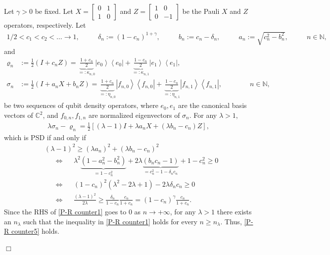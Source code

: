 \documentclass[unsortedaddress,superscriptaddress,pra,notitlepage]{revtex4}
\newenvironment{proof}[1][Proof]{\begin{trivlist}
\item[\hskip \labelsep {\bfseries #1}]}{\hfill$\Box$\end{trivlist}}
\newcommand{\nn}{\nonumber \\}
\def\bN{\mathbb{N}}
\def\bC{\mathbb{C}}
\def\rho{\varrho}
\def\half{\frac{1}{2}}
\def\iff{\Longleftrightarrow}
\def\bz{\left(}
\def\jz{\right)}
\def\nn{\nonumber}
\newcommand{\ds}{\mbox{ }\mbox{ }}
\newcommand{\diad}[2]{\left|#1\right\rangle\!\left\langle #2\right|}
\newcommand{\pr}[1]{\diad{#1}{#1}}
\begin{document}
\begin{proof}
Let $\gamma>0$ be fixed. Let $X=\begin{bmatrix}0 & 1\\ 1 & 0\end{bmatrix}$ and 
$Z=\begin{bmatrix}1 & 0\\ 0 & -1\end{bmatrix}$ be the Pauli $X$ and $Z$ operators, respectively. Let 
\begin{align*}
1/2<c_1<c_2<\ldots\to 1,\ds\ds
\delta_n:=(1-c_n)^{1+\gamma},\ds\ds
b_n:=c_n-\delta_n,\ds\ds
a_n:=\sqrt{c_n^2-b_n^2},\ds\ds n\in\bN,
\end{align*}
and
\begin{align*}
\rho_n&:=\half\bz I+c_n Z\jz=\underbrace{\frac{1+c_n}{2}}_{=:\kappa_{n,0}}\pr{e_0}
+\underbrace{\frac{1-c_n}{2}}_{=:\kappa_{n,1}}\pr{e_1},\\
\sigma_n&:=\half(I+a_nX+b_nZ)=\underbrace{\frac{1+c_n}{2}}_{=:\eta_{n,0}}\pr{f_{n,0}}
+\underbrace{\frac{1-c_n}{2}}_{=:\eta_{n,1}}\pr{f_{n,1}},
\ds\ds\ds
n\in\bN,
\end{align*}
be two sequences of qubit density operators, where 
$e_0,e_1$ are the canonical basis vectors of $\bC^2$, and 
$f_{0,n},f_{1,n}$ are normalized eigenvectors of $\sigma_n$.
For any $\lambda>1$, 
\begin{align*}
\lambda\sigma_n-\rho_n
=
\half\left[(\lambda-1)I+\lambda a_n X+(\lambda b_n-c_n)Z\right],
\end{align*}
which is PSD if and only if
\begin{align}
&(\lambda-1)^2\ge (\lambda a_n)^2+(\lambda b_n-c_n)^2\nn\\
&\ds\iff\ds
\lambda^2\underbrace{(1-a_n^2-b_n^2)}_{=1-c_n^2}
+2\lambda\underbrace{(b_nc_n-1)}_{=c_n^2-1-\delta_nc_n}+1-c_n^2\ge 0\nn\\
&\ds\iff\ds
(1-c_n)^2(\lambda^2-2\lambda+1)-2\lambda\delta_nc_n\ge 0\nn\\
&\ds\iff\ds
\frac{(\lambda-1)^2}{2\lambda}
\ge 
\frac{\delta_n}{1-c_n}\frac{c_n}{1+c_n}
=
(1-c_n)^{\gamma}\frac{c_n}{1+c_n}.
\label{P-R counter1}
\end{align}
Since the RHS of \eqref{P-R counter1} goes to $0$ as $n\to+\infty$, 
for any $\lambda>1$ there exists an $n_{\lambda}$ such that 
the inequality in \eqref{P-R counter1} holds for every $n\ge n_{\lambda}$.
Thus, 
\eqref{P-R counter5} holds.


\end{proof}
\end{document}
